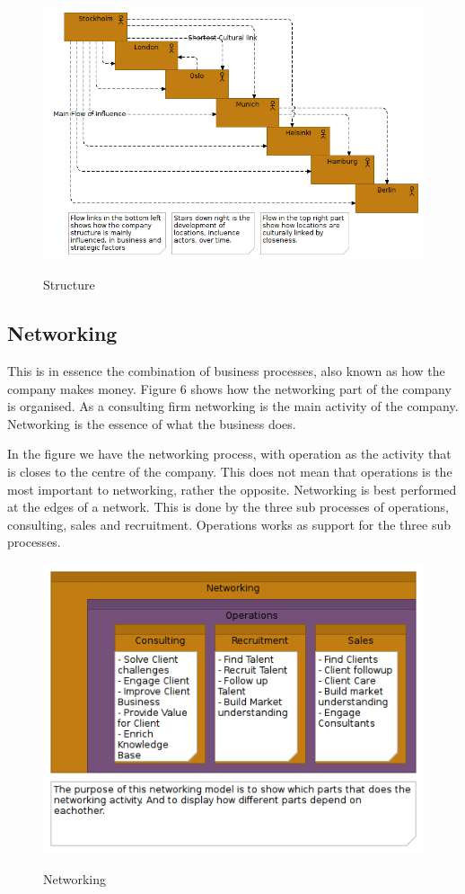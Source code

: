 \documentclass[12pt, a4paper]{article}
\begin{document}
\begin{figure}[htb]
    \centering
    \includegraphics[width=\textwidth]{Structure} 
    \label{fig:Structure}
    \caption{Structure}
\end{figure}

\subsection{Networking}
This is in essence the combination of business processes, also known as how the
company makes money. Figure 6 shows how the networking part of the company is
organised. As a consulting firm networking is the main activity of the company.
Networking is the essence of what the business does. 

In the figure we have the networking process, with operation as the activity
that is closes to the centre of the company. This does not mean that operations
is the most important to networking, rather the opposite. Networking is best
performed at the edges of a network. This is done by the three sub processes of
operations, consulting, sales and recruitment. Operations works as support for
the three sub processes. 

\begin{figure}[htb]
    \centering
    \includegraphics[width=\textwidth]{Networking(BP)} 
    \label{fig:Networking}
    \caption{Networking}
\end{figure}
\end{document}
